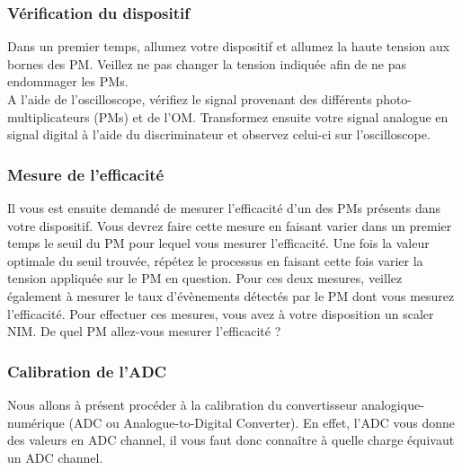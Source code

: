 \subsubsection{Vérification du dispositif}
Dans un premier temps, allumez votre dispositif et allumez la haute tension aux bornes des PM. Veillez ne pas changer la tension indiquée afin de ne pas endommager les PMs.\\
A l'aide de l'oscilloscope, vérifiez le signal provenant des différents photo-multiplicateurs (PMs) et de l'OM. Transformez ensuite votre signal analogue en signal digital à l'aide du discriminateur et observez celui-ci sur l'oscilloscope.

\subsubsection{Mesure de l'efficacité}

Il vous est ensuite demandé de mesurer l'efficacité d'un des PMs présents dans votre dispositif. Vous devrez faire cette mesure en faisant varier dans un premier temps le seuil du PM pour lequel vous mesurer l'efficacité. Une fois la valeur optimale du seuil trouvée, répétez le processus en faisant cette fois varier la tension appliquée sur le PM en question. Pour ces deux mesures, veillez également à mesurer le taux d'évènements détectés par le PM dont vous mesurez l'efficacité. Pour effectuer ces mesures, vous avez à votre disposition un scaler NIM. De quel PM allez-vous mesurer l'efficacité ?


\subsubsection{Calibration de l'ADC}

Nous allons à présent procéder à la calibration du convertisseur analogique-numérique (ADC ou Analogue-to-Digital Converter). En effet, l'ADC vous donne des valeurs en ADC channel, il vous faut donc connaître à quelle charge équivaut un ADC channel.\\

